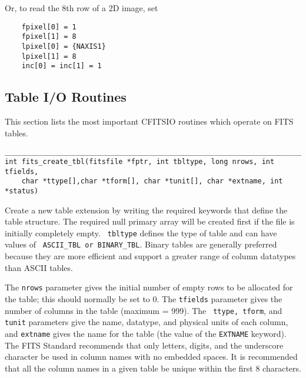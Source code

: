 \documentclass[11pt]{article}
\begin{document}
Or, to read the 8th row of a 2D image, set 
\begin{verbatim}
    fpixel[0] = 1
    fpixel[1] = 8
    lpixel[0] = {NAXIS1}
    lpixel[1] = 8
    inc[0] = inc[1] = 1
\end{verbatim}

\newpage
\subsection{Table I/O Routines}

This section lists the most important CFITSIO routines which operate on
FITS tables.

\begin{verbatim}
__________________________________________________________________________
int fits_create_tbl(fitsfile *fptr, int tbltype, long nrows, int tfields,
    char *ttype[],char *tform[], char *tunit[], char *extname, int *status)
\end{verbatim}

Create a new  table extension by writing the required keywords that
define the table structure. The required null primary array
will be created first if the file is initially completely empty.  {\tt
tbltype} defines the type of table and can have values of {\tt
ASCII\_TBL or BINARY\_TBL}.  Binary tables are generally preferred
because they are more efficient and support a greater range of column
datatypes than ASCII tables.

The {\tt nrows} parameter gives the initial number of empty rows to be
allocated for the table; this should normally be set to 0.  The {\tt tfields}
parameter gives the number of columns in the table (maximum = 999).
The {\tt
ttype, tform}, and {\tt tunit} parameters give the name, datatype, and
physical units of each column, and {\tt extname} gives the name for the
table (the value of the {\tt EXTNAME} keyword).  
The FITS Standard recommends that only
letters, digits, and the underscore character be used in column names
with no embedded spaces.  It is recommended that all the column names
in a given table be unique within the first 8 characters.
\end{document}
